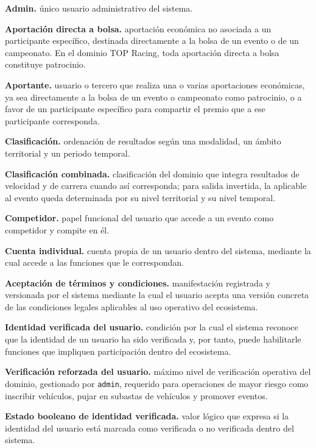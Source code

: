 \documentclass[10pt,letterpaper]{article}
\begin{document}
\noindent\textbf{Admin.} único usuario administrativo del sistema.\par
\noindent\textbf{Aportación directa a bolsa.} aportación económica no asociada a un participante específico, destinada directamente a la bolsa de un evento o de un campeonato. En el dominio TOP Racing, toda aportación directa a bolsa constituye patrocinio.\par
\noindent\textbf{Aportante.} usuario o tercero que realiza una o varias aportaciones económicas, ya sea directamente a la bolsa de un evento o campeonato como patrocinio, o a favor de un participante específico para compartir el premio que a ese participante corresponda.\par
\noindent\textbf{Clasificación.} ordenación de resultados según una modalidad, un ámbito territorial y un periodo temporal.\par
\noindent\textbf{Clasificación combinada.} clasificación del dominio que integra resultados de velocidad y de carrera cuando así corresponda; para salida invertida, la aplicable al evento queda determinada por su nivel territorial y su nivel temporal.\par
\noindent\textbf{Competidor.} papel funcional del usuario que accede a un evento como competidor y compite en él.\par
\noindent\textbf{Cuenta individual.} cuenta propia de un usuario dentro del sistema, mediante la cual accede a las funciones que le correspondan.\par
\noindent\textbf{Aceptación de términos y condiciones.} manifestación registrada y versionada por el sistema mediante la cual el usuario acepta una versión concreta de las condiciones legales aplicables al uso operativo del ecosistema.\par
\noindent\textbf{Identidad verificada del usuario.} condición por la cual el sistema reconoce que la identidad de un usuario ha sido verificada y, por tanto, puede habilitarle funciones que impliquen participación dentro del ecosistema.\par
\noindent\textbf{Verificación reforzada del usuario.} máximo nivel de verificación operativa del dominio, gestionado por \texttt{admin}, requerido para operaciones de mayor riesgo como inscribir vehículos, pujar en subastas de vehículos y promover eventos.\par
\noindent\textbf{Estado booleano de identidad verificada.} valor lógico que expresa si la identidad del usuario está marcada como verificada o no verificada dentro del sistema.\par
\end{document}
